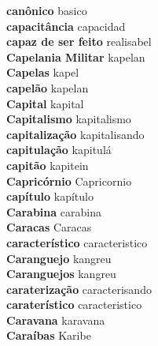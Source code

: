 \textbf{ canônico  } basico \\
\textbf{ capacitância  } capacidad \\
\textbf{ capaz de ser feito  } realisabel \\
\textbf{ Capelania Militar  } kapelan \\
\textbf{ Capelas  } kapel \\
\textbf{ capelão  } kapelan \\
\textbf{ Capital  } kapital \\
\textbf{ Capitalismo  } kapitalismo \\
\textbf{ capitalização  } kapitalisando \\
\textbf{ capitulação  } kapitulá \\
\textbf{ capitão  } kapitein \\
\textbf{ Capricórnio  } Capricornio \\
\textbf{ capítulo  } kapítulo \\
\textbf{ Carabina  } carabina \\
\textbf{ Caracas  } Caracas \\
\textbf{ característico  } caracteristico \\
\textbf{ Caranguejo  } kangreu \\
\textbf{ Caranguejos  } kangreu \\
\textbf{ caraterização  } caracterisando \\
\textbf{ caraterístico  } caracteristico \\
\textbf{ Caravana  } karavana \\
\textbf{ Caraíbas  } Karibe \\
